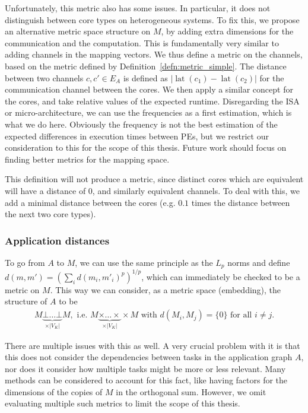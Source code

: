 Unfortunately, this metric also has some issues.
In particular, it does not distinguish between core types on heterogeneous systems.
To fix this, we propose an alternative metric space structure on $M$, by adding extra dimensions for the communication and the computation.
This is fundamentally very similar to adding channels in the mapping vectors.
We thus define a metric on the channels, based on the metric defined by Definition~\ref{defn:metric_simple}.
The distance between two channels $c,c' \in E_A$ is defined as $|\operatorname{lat}(c_1) - \operatorname{lat}(c_2)|$ for the communication channel between the cores.
We then apply a similar concept for the cores, and take relative values of the expected runtime. 
Disregarding the \ac{ISA} or micro-architecture, we can use the frequencies as a first estimation, which is what we do here.
Obviously the frequency is not the best estimation of the expected differences in execution times between \acp{PE}, but we restrict our consideration to this for the scope of this thesis.
Future work should focus on finding better metrics for the mapping space.

This definition will not produce a metric, since distinct cores which are equivalent will have a distance of $0$, and similarly equivalent channels. 
To deal with this, we add a minimal distance between the cores (e.g. $0.1$ times the distance between the next two core types).

\subsubsection{Application distances}

To go from $A$ to $M$, we can use the same principle as the $L_p$ norms and define $d(m,m') = (\sum_i d(m_i,m'_i)^p)^{1/p}$, which can immediately be checked to be a metric on $M$.
This way we can consider, as a metric space (embedding), the structure of $A$ to be
 \begin{align} \label{eqn:orthogonal_sum} M \underbrace{\bot \ldots \bot}_{ \times |V_K|} M,\text{ i.e. }M \underbrace{\times \ldots \times }_{\times |V_K|} \times M \text{ with } d(M_i,M_j) = \{0\} \text{ for all } i \neq j. \end{align} 

There are multiple issues with this as well. 
A very crucial problem with it is that this does not consider the dependencies between tasks in the application graph $A$, nor does it consider how multiple tasks might be more or less relevant.
Many methods can be considered to account for this fact, like having factors for the dimensions of the copies of $M$ in the orthogonal sum.
However, we omit evaluating multiple such metrics to limit the scope of this thesis.

